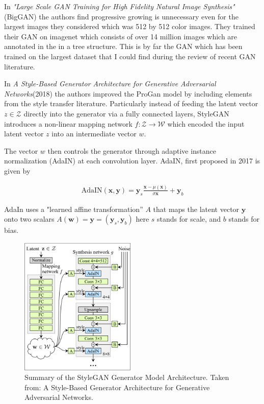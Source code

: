 In \textit{"Large Scale GAN Training for High Fidelity Natural Image Synthesis"}(BigGAN) \cite{biggan} the authors find progressive growing is unnecessary even for the largest images they considered which was 512 by 512 color images. They trained their GAN on imagenet which consists of over 14 million images which are annotated in the in a tree structure.\cite{imagenet} This is by far the GAN which has been trained on the largest dataset that I could find during the review of recent GAN literature.

In \textit{A Style-Based Generator Architecture for Generative Adversarial Networks}(2018)\cite{stylegan} the authors improved the ProGan model by including elements from the style transfer literature. Particularly instead of feeding the latent vector $z\in\mathcal{Z}$ directly into the generator via a fully connected layers, StyleGAN introduces a non-linear mapping network $f:\mathcal{Z}\to\mathcal{W}$ which encoded the input latent vector $z$ into an intermediate vector $w$.

The vector $w$ then controls the generator through adaptive instance normalization (AdaIN) at each convolution layer.
AdaIN, first proposed in 2017 \cite{adain} is given by

\begin{align}
  \text{AdaIN}(\mathbf{x},\mathbf{y}) = \mathbf{y}_s \frac{\mathbf{x}-\mu(\mathbf{x})}{\sigma{\mathbf{x}}}+\mathbf{y}_b
\end{align}

AdaIn uses a "learned affine transformation” $A$ that maps the latent  vector $\mathbf{y}$ onto two scalars $A(\mathbf{w})= \mathbf{y}=(\mathbf{y}_s,\mathbf{y}_b)$ here $s$ stands for scale, and $b$ stands for bias.


\begin{figure}
\includegraphics[width=5.5cm]{fig/stylegan-arch}
\caption{Summary of the StyleGAN Generator Model Architecture.
Taken from: A Style-Based Generator Architecture for Generative Adversarial Networks.\cite{stylegan}}
\label{stylegan-arch}
\end{figure}

